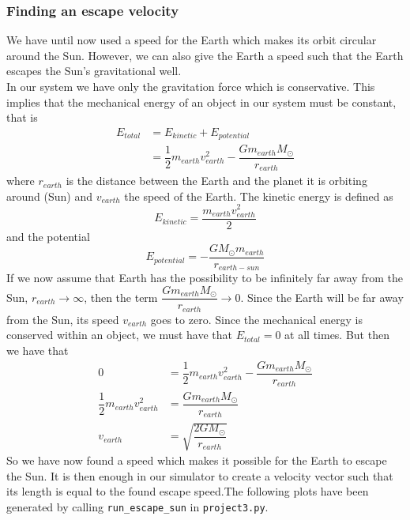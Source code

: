 \documentclass[12pt]{article}
\newcommand{\Ms}{M_\odot}
\begin{document}
	\subsubsection{Finding an escape velocity}
	We have until now used a speed for the Earth which makes its orbit circular around the Sun. However, we can also give the Earth a speed such that the Earth escapes the Sun's gravitational well. \\
	In our system we have only the gravitation force which is conservative. This implies that the mechanical energy of an object in our system must be constant, that is
	\begin{equation*}
	\begin{aligned}
			E_{total} &= E_{kinetic} + E_{potential} \\
			&= \dfrac{1}{2}m_{earth}v_{earth}^2 - \dfrac{Gm_{earth}\Ms}{r_{earth}}
	\end{aligned}
	\end{equation*}
	where $r_{earth}$ is the distance between the Earth and the planet it is orbiting around (Sun) and $v_{earth}$ the speed of the Earth. The kinetic energy is defined as 
	\begin{equation*}
		E_{kinetic} = \dfrac{m_{earth}v_{earth}^2}{2}
	\end{equation*}
	and the potential
	\begin{equation*}
		E_{potential} = - \dfrac{G\Ms m_{earth}}{r_{earth-sun}}
	\end{equation*}
	If we now assume that Earth has the possibility to be infinitely far away from the Sun, $r_{earth} \to \infty$, then the term $\dfrac{Gm_{earth}\Ms}{r_{earth}} \to 0$. Since the Earth will be far away from the Sun, its speed $v_{earth}$ goes to zero. Since the mechanical energy is conserved within an object, we must have that $E_{total} = 0$ at all times. But then we have that
	\begin{equation}\label{eq:22}
	\begin{aligned}
	 0 &= \dfrac{1}{2}m_{earth}v_{earth}^2 - \dfrac{Gm_{earth}\Ms}{r_{earth}} \\
	  \dfrac{1}{2}m_{earth}v_{earth}^2 &= \dfrac{Gm_{earth}\Ms}{r_{earth}} \\
	  v_{earth}&= \sqrt{\dfrac{2G\Ms}{r_{earth}}}
	\end{aligned}
	\end{equation}
	So we have now found a speed which makes it possible for the Earth to escape the Sun. It is then enough in our simulator to create a velocity vector such that its length is equal to the found escape speed.The following plots have been generated by calling \texttt{run\_escape\_sun} in \texttt{project3.py}.\\
\end{document}
